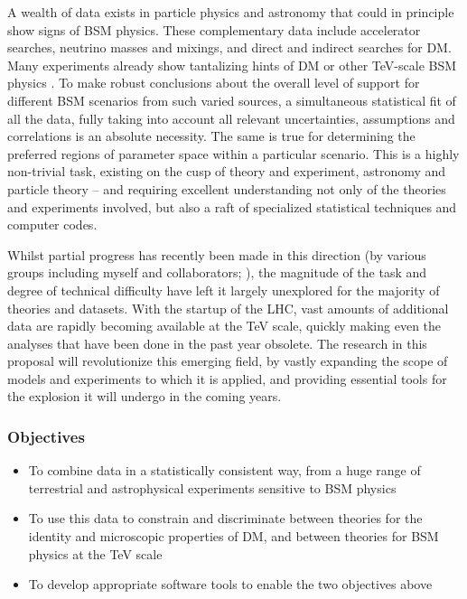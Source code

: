 \documentclass[10pt,oneside,twocolumn,a4paper]{article}
\begin{document}
A wealth of data exists in particle physics and astronomy that could in principle show signs of BSM physics.  These complementary data include accelerator searches, neutrino masses and mixings, and direct and indirect searches for DM.  Many experiments already show tantalizing hints of DM \cite{Bernabei08,CoGeNTAnnMod11,CRESST11,Hooper11,Pamelapositron} or other TeV-scale BSM physics \cite{ATLASHgammagamma11,CDFdijet,CDFtopforwardbackward,CDFBmumu11,Akhmedov10,Hamann10}.  To make robust conclusions about the overall level of support for different BSM scenarios from such varied sources, a simultaneous statistical fit of all the data, fully taking into account all relevant uncertainties, assumptions and correlations is an absolute necessity.  The same is true for determining the preferred regions of parameter space within a particular scenario.  This is a highly non-trivial task, existing on the cusp of theory and experiment, astronomy and particle theory -- and requiring excellent understanding not only of the theories and experiments involved, but also a raft of specialized statistical techniques and computer codes.

Whilst partial progress has recently been made in this direction (by various groups including myself and collaborators; \cite{Baltz04, Sfitter, Fittino, Ruiz06, Allanach06, Trotta08, Scott09c, Buchmueller09, Akrami09, AbdusSalam09a, AbdusSalam09b, Ripken11, Allanach11a, Allanach11b, Mastercode11, MastercodeXENON100, SuperbayesXENON100, Arina11, Pato11}), the magnitude of the task and degree of technical difficulty have left it largely unexplored for the majority of theories and datasets.  With the startup of the LHC, vast amounts of additional data are rapidly becoming available at the TeV scale, quickly making even the analyses that have been done in the past year obsolete.  The research in this proposal will revolutionize this emerging field, by vastly expanding the scope of models and experiments to which it is applied, and providing essential tools for the explosion it will undergo in the coming years.

\subsubsection*{Objectives}

\begin{itemize}
\item To combine data in a statistically consistent way, from a huge range of terrestrial and astrophysical experiments sensitive to BSM physics
\item To use this data to constrain and discriminate between theories for the identity and microscopic properties of DM, and between theories for BSM physics at the TeV scale
\item To develop appropriate software tools to enable the two objectives above
\end{itemize}
\end{document}
